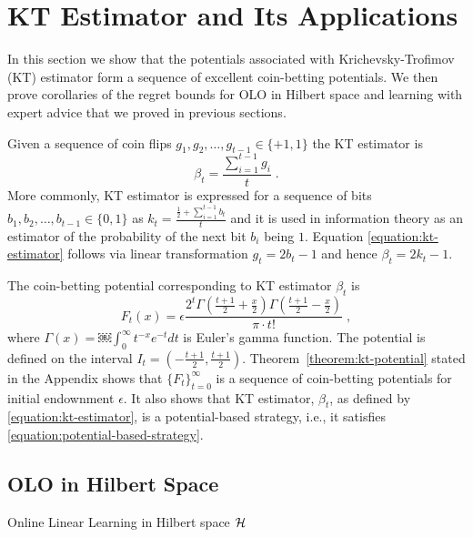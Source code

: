 \section{KT Estimator and Its Applications}
\label{section:kt-estimator}

In this section we show that the potentials associated with Krichevsky-Trofimov
(KT) estimator form a sequence of excellent coin-betting potentials. We then
prove corollaries of the regret bounds for OLO in Hilbert space and learning
with expert advice that we proved in previous sections.

Given a sequence of coin flips $g_1, g_2, \dots, g_{t-1} \in \{+1,1\}$
the KT estimator is
\begin{equation}
\label{equation:kt-estimator}
\beta_t = \frac{\sum_{i=1}^{t-1} g_i}{t} \; .
\end{equation}
More commonly, KT estimator is expressed for a sequence of bits $b_1, b_2,
\dots, b_{t-1} \in \{0,1\}$ as $k_t = \frac{\frac{1}{2} + \sum_{i=1}^{t-1}
b_t}{t}$ and it is used in information theory as an estimator
of the probability of the next bit $b_i$ being $1$. Equation
\eqref{equation:kt-estimator} follows via linear transformation $g_t = 2b_t - 1$
and hence $\beta_t = 2k_t - 1$.

The coin-betting potential corresponding to KT estimator $\beta_t$ is
\begin{equation}
\label{equation:kt-estimator-potential}
F_t(x) = \epsilon \frac{2^t \Gamma(\frac{t+1}{2} + \frac{x}{2}) \Gamma(\frac{t+1}{2} - \frac{x}{2})}{\pi \cdot t!} \; ,
\end{equation}
where $\Gamma(x) = ￼\int_0^\infty t^{-x} e^{-t} dt$ is Euler's gamma function.
The potential is defined on the interval $I_t = (-\frac{t+1}{2},
\frac{t+1}{2})$. Theorem~\ref{theorem:kt-potential} stated in the Appendix shows
that $\{F_t\}_{t=0}^\infty$ is a sequence of coin-betting potentials for initial
endownment $\epsilon$. It also shows that KT estimator, $\beta_t$, as defined by
\eqref{equation:kt-estimator}, is a potential-based strategy, i.e., it satisfies
\eqref{equation:potential-based-strategy}.

\subsection{OLO in Hilbert Space}

\begin{algorithm}[t]
\caption{Online Linear Learning in Hilbert space $\mathcal{H}$}
\begin{algorithmic}
{
\ENDFOR
}
\end{algorithmic}
\label{algorithm:kt-hilbert-space-olo}
\end{algorithm}

